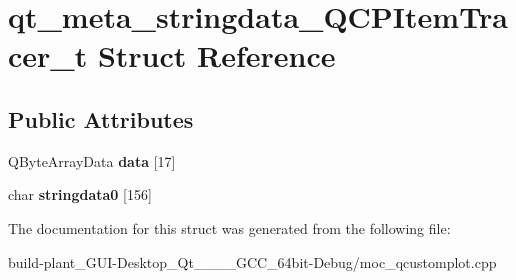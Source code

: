 \hypertarget{structqt__meta__stringdata__QCPItemTracer__t}{}\section{qt\+\_\+meta\+\_\+stringdata\+\_\+\+Q\+C\+P\+Item\+Tracer\+\_\+t Struct Reference}
\label{structqt__meta__stringdata__QCPItemTracer__t}
\subsection*{Public Attributes}
\begin{DoxyCompactItemize}
\item 
\mbox{\label{structqt__meta__stringdata__QCPItemTracer__t_a22eae99e6c4a456148200505b43289b8}} 
Q\+Byte\+Array\+Data {\bfseries data} \mbox{[}17\mbox{]}
\item 
\mbox{\label{structqt__meta__stringdata__QCPItemTracer__t_a716a4a42fdc434d4a1e9e7b141e3715d}} 
char {\bfseries stringdata0} \mbox{[}156\mbox{]}
\end{DoxyCompactItemize}


The documentation for this struct was generated from the following file\+:\begin{DoxyCompactItemize}
\item 
build-\/plant\+\_\+\+G\+U\+I-\/\+Desktop\+\_\+\+Qt\+\_\+\_\+\_\+\_\+\+G\+C\+C\+\_\+64bit-\/\+Debug/moc\+\_\+qcustomplot.\+cpp\end{DoxyCompactItemize}
